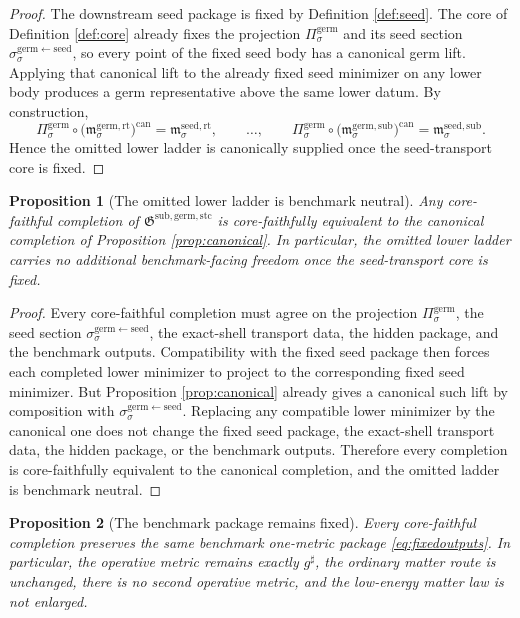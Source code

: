 \documentclass[11pt]{article}
\newcommand{\CompletedMetric}{g^{\sharp}}
\newcommand{\SeedRootMin}[1]{\mathfrak m_{#1}^{\mathrm{seed,rt}}}
\newcommand{\SeedSubMin}[1]{\mathfrak m_{#1}^{\mathrm{seed,sub}}}
\newcommand{\GermTransportCore}{\mathfrak G^{\mathrm{sub,germ,stc}}}
\newcommand{\GermProj}[1]{\Pi_{#1}^{\mathrm{germ}}}
\newcommand{\GermSeedSec}[1]{\sigma_{#1}^{\mathrm{germ\leftarrow seed}}}
\newcommand{\GermRootMin}[1]{\mathfrak m_{#1}^{\mathrm{germ,rt}}}
\newcommand{\GermSubMin}[1]{\mathfrak m_{#1}^{\mathrm{germ,sub}}}
\newtheorem{proposition}{Proposition}
\begin{document}
\begin{proof}
The downstream seed package is fixed by Definition \ref{def:seed}. The core of Definition \ref{def:core} already fixes the projection \(\GermProj{\sigma}\) and its seed section \(\GermSeedSec{\sigma}\), so every point of the fixed seed body has a canonical germ lift. Applying that canonical lift to the already fixed seed minimizer on any lower body produces a germ representative above the same lower datum. By construction,
\[
\GermProj{\sigma}\circ\bigl(\GermRootMin{\sigma}\bigr)^{\mathrm{can}}
=
\SeedRootMin{\sigma},
\qquad
\ldots,
\qquad
\GermProj{\sigma}\circ\bigl(\GermSubMin{\sigma}\bigr)^{\mathrm{can}}
=
\SeedSubMin{\sigma}.
\]
Hence the omitted lower ladder is canonically supplied once the seed-transport core is fixed.
\end{proof}

\begin{proposition}[The omitted lower ladder is benchmark neutral]
\label{prop:neutral}
Any core-faithful completion of \(\GermTransportCore\) is core-faithfully equivalent to the canonical completion of Proposition \ref{prop:canonical}. In particular, the omitted lower ladder carries no additional benchmark-facing freedom once the seed-transport core is fixed.
\end{proposition}

\begin{proof}
Every core-faithful completion must agree on the projection \(\GermProj{\sigma}\), the seed section \(\GermSeedSec{\sigma}\), the exact-shell transport data, the hidden package, and the benchmark outputs. Compatibility with the fixed seed package then forces each completed lower minimizer to project to the corresponding fixed seed minimizer. But Proposition \ref{prop:canonical} already gives a canonical such lift by composition with \(\GermSeedSec{\sigma}\). Replacing any compatible lower minimizer by the canonical one does not change the fixed seed package, the exact-shell transport data, the hidden package, or the benchmark outputs. Therefore every completion is core-faithfully equivalent to the canonical completion, and the omitted ladder is benchmark neutral.
\end{proof}

\begin{proposition}[The benchmark package remains fixed]
\label{prop:benchmark}
Every core-faithful completion preserves the same benchmark one-metric package \eqref{eq:fixedoutputs}. In particular, the operative metric remains exactly \(\CompletedMetric\), the ordinary matter route is unchanged, there is no second operative metric, and the low-energy matter law is not enlarged.
\end{proposition}
\end{document}
